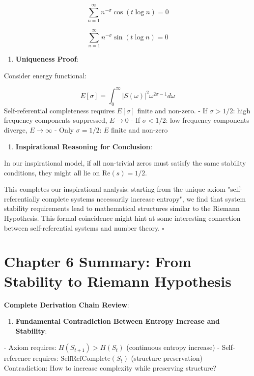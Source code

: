 \begin{equation}
\sum_{n=1}^{\infty} n^{-\sigma} \cos(t \log n) = 0
\end{equation}
   
\begin{equation}
\sum_{n=1}^{\infty} n^{-\sigma} \sin(t \log n) = 0
\end{equation}

\begin{enumerate}
\item \textbf{Uniqueness Proof}:
\end{enumerate}
   Consider energy functional:
   
\begin{equation}
E[\sigma] = \int_0^\infty |S(\omega)|^2 \omega^{2\sigma-1} d\omega
\end{equation}
   Self-referential completeness requires $E[\sigma]$ finite and non-zero.
   - If $\sigma > 1/2$: high frequency components suppressed, $E \to 0$
   - If $\sigma < 1/2$: low frequency components diverge, $E \to \infty$
   - Only $\sigma = 1/2$: $E$ finite and non-zero
   
\begin{enumerate}
\item \textbf{Inspirational Reasoning for Conclusion}:
\end{enumerate}
   In our inspirational model, if all non-trivial zeros must satisfy the same stability conditions,
   they might all lie on $\text{Re}(s) = 1/2$.

This completes our inspirational analysis: starting from the unique axiom "self-referentially complete systems necessarily increase entropy",
we find that system stability requirements lead to mathematical structures similar to the Riemann Hypothesis.
This formal coincidence might hint at some interesting connection between self-referential systems and number theory. $\square$

\section{Chapter 6 Summary: From Stability to Riemann Hypothesis}
\label{sec:ch06_riemann:chapter-6-summary-from-stability-to-riemann-hypothesis}

\textbf{Complete Derivation Chain Review}:

\begin{enumerate}
\item \textbf{Fundamental Contradiction Between Entropy Increase and Stability}:
\end{enumerate}
   - Axiom requires: $H(S_{t+1}) > H(S_t)$ (continuous entropy increase)
   - Self-reference requires: $\text{SelfRefComplete}(S_t)$ (structure preservation)
   - Contradiction: How to increase complexity while preserving structure?

